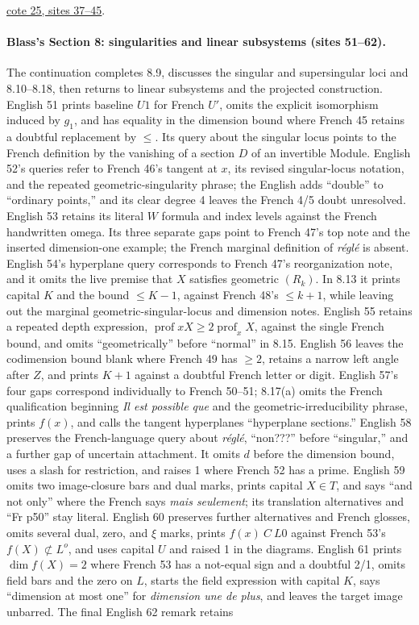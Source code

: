 \documentclass[10pt,a4paper]{article}
\begin{document}
\href{https://grothendieck.umontpellier.fr/web/viewer.html?file=../25.pdf\#page=38}{cote 25, sites 37--45}.

\paragraph{Blass's Section 8: singularities and linear subsystems (sites 51--62).}
The continuation completes 8.9, discusses the singular and supersingular loci and 8.10--8.18, then returns to linear subsystems and the projected construction. English 51 prints baseline $U1$ for French $U'$, omits the explicit isomorphism induced by $g_1$, and has equality in the dimension bound where French 45 retains a doubtful replacement by $\leq$. Its query about the singular locus points to the French definition by the vanishing of a section $D$ of an invertible Module. English 52's queries refer to French 46's tangent at $x$, its revised singular-locus notation, and the repeated geometric-singularity phrase; the English adds ``double'' to ``ordinary points,'' and its clear degree 4 leaves the French 4/5 doubt unresolved. English 53 retains its literal $W$ formula and index levels against the French handwritten omega. Its three separate gaps point to French 47's top note and the inserted dimension-one example; the French marginal definition of \emph{réglé} is absent. English 54's hyperplane query corresponds to French 47's reorganization note, and it omits the live premise that $X$ satisfies geometric $(R_k)$. In 8.13 it prints capital $K$ and the bound $\leq K-1$, against French 48's $\leq k+1$, while leaving out the marginal geometric-singular-locus and dimension notes. English 55 retains a repeated depth expression, $\operatorname{prof}xX\geq2\operatorname{prof}_xX$, against the single French bound, and omits ``geometrically'' before ``normal'' in 8.15. English 56 leaves the codimension bound blank where French 49 has $\geq2$, retains a narrow left angle after $Z$, and prints $K+1$ against a doubtful French letter or digit. English 57's four gaps correspond individually to French 50--51; 8.17(a) omits the French qualification beginning \emph{Il est possible que} and the geometric-irreducibility phrase, prints $f(x)$, and calls the tangent hyperplanes ``hyperplane sections.'' English 58 preserves the French-language query about \emph{réglé}, ``non???'' before ``singular,'' and a further gap of uncertain attachment. It omits $d$ before the dimension bound, uses a slash for restriction, and raises 1 where French 52 has a prime. English 59 omits two image-closure bars and dual marks, prints capital $X\in T$, and says ``and not only'' where the French says \emph{mais seulement}; its translation alternatives and ``Fr p50'' stay literal. English 60 preserves further alternatives and French glosses, omits several dual, zero, and $\xi$ marks, prints $f(x)\ C\ L0$ against French 53's $f(X)\not\subset L^o$, and uses capital $U$ and raised 1 in the diagrams. English 61 prints $\dim f(X)=2$ where French 53 has a not-equal sign and a doubtful 2/1, omits field bars and the zero on $L$, starts the field expression with capital $K$, says ``dimension at most one'' for \emph{dimension une de plus}, and leaves the target image unbarred. The final English 62 remark retains 
\end{document}
